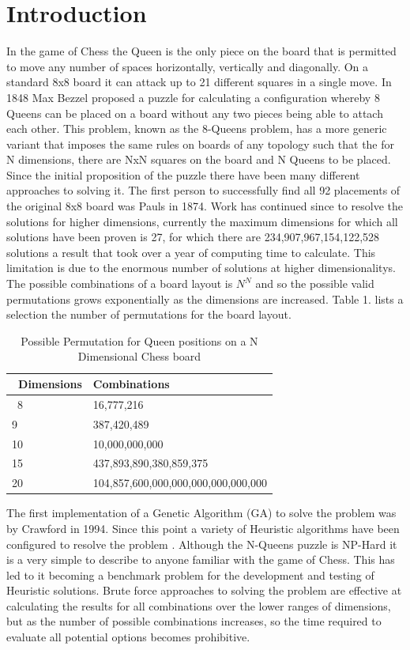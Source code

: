 \documentclass[conference]{IEEEtran}
\begin{document}
\section{Introduction}
In the game of Chess the Queen is the only piece on the board that is permitted to move any number of spaces horizontally, vertically and diagonally. On a standard 8x8 board it can attack up to 21 different squares in a single move. In 1848 Max Bezzel proposed a puzzle for calculating a configuration whereby 8 Queens can be placed on a board without any two pieces being able to attach each other. This problem, known as the 8-Queens problem, has a more generic variant that imposes the same rules on boards of any topology such that the for N dimensions, there are NxN squares on the board and N Queens to be placed. Since the initial proposition of the puzzle there have been many different approaches to solving it. The first person to successfully find all 92 placements of the original 8x8 board was Pauls \cite{Pauls} in 1874. Work has continued since to resolve the solutions for higher dimensions, currently the maximum dimensions for which all solutions have been proven is 27, for which there are 234,907,967,154,122,528 solutions a result that took over a year of computing time to calculate\cite{27Queens}. This limitation is due to the enormous number of solutions at higher dimensionalitys. The possible combinations of a board layout is $N^{N}$ and so the possible valid permutations grows exponentially as the dimensions are increased. Table 1. lists a selection the number of permutations for the board layout.

\begin{table}[!htbp]
	\begin{tabular}{|l |l|} 
		\hline\
		Dimensions & Combinations \\
		\hline\
		8 & 16,777,216 \\ 
		9 & 387,420,489 \\
		10 & 10,000,000,000 \\
		15 & 437,893,890,380,859,375 \\
		20 & 104,857,600,000,000,000,000,000,000\\
	\hline
	\end{tabular}
	\caption{Possible Permutation for Queen positions on a N Dimensional Chess board} 
\end{table}

The first implementation of a Genetic Algorithm (GA) to solve the problem was by Crawford \cite{Crawford} in 1994. Since this point a variety of Heuristic algorithms have been configured to resolve the problem \cite{AdvanceMutation} \cite{ACO} \cite{comparison} \cite{PSO}. Although the N-Queens puzzle is NP-Hard it is a very simple to describe to anyone familiar with the game of Chess. This has led to it becoming a benchmark problem for the development and testing of Heuristic solutions. Brute force approaches to solving the problem are effective at calculating the results for all combinations over the lower ranges of dimensions, but as the number of possible combinations increases, so the time required to evaluate all potential options becomes prohibitive.
\end{document}
